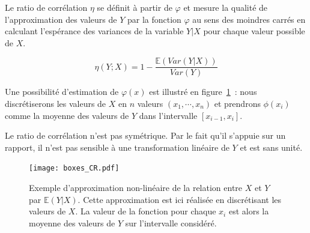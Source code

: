 \documentclass[../main]{subfiles}
\begin{document}
Le ratio de corrélation $\eta$ se définit à partir de $\varphi$ et mesure la qualité de l'approximation des valeurs de $Y$ par la fonction $\varphi$ au sens des moindres carrés en calculant l'espérance des variances de la variable $Y|X$ pour chaque valeur possible de $X$. 

\begin{equation}\label{eq:cr}
   \eta(Y;X) = 1 - \frac{\mathbb{E}(Var(Y|X))}{Var(Y)}
\end{equation}

Une possibilité d'estimation de $\varphi(x)$ est illustré en figure~\ref{fig:cr_box}~: nous discrétiserons les valeurs de $X$ en $n$ valeurs $(x_1, \cdots, x_n)$ et prendrons $\phi(x_i)$ comme la moyenne des valeurs de $Y$ dans l'intervalle $[x_{i-1}, x_i]$.






Le ratio de corrélation n'est pas symétrique. Par le fait qu'il s'appuie sur un rapport, il n'est pas sensible à une transformation linéaire de $Y$ et est sans unité.

\begin{figure}
    \centering
    \texttt{[image: boxes\_CR.pdf]}
    \caption{Exemple d'approximation non-linéaire de la relation entre $X$ et $Y$ par $\mathbb{E}(Y|X)$. Cette approximation est ici réalisée en discrétisant les valeurs de $X$. La valeur de la fonction pour chaque $x_i$ est alors la moyenne des valeurs de $Y$ sur l'intervalle considéré.\label{fig:cr_box}}
\end{figure}
\end{document}
